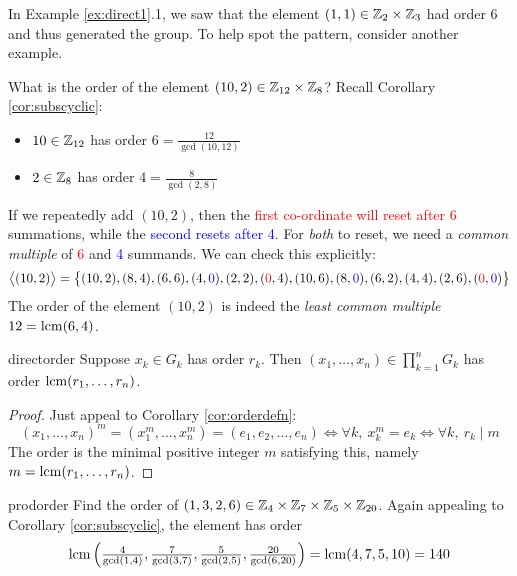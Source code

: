 In Example \ref{ex:direct1}.1, we saw that the element $(1,1)\in\mathbb{Z}_2\times\mathbb{Z}_3$ had order 6 and thus generated the group. To help spot the pattern, consider another example.

\begin{example}{}{}
What is the order of the element $(10,2)\in\mathbb{Z}_{12}\times \mathbb{Z}_8$? Recall Corollary \ref{cor:subscyclic}:
\begin{itemize}\itemsep0pt
  \item $10\in\mathbb{Z}_{12}$ has order $6=\frac{12}{\gcd(10,12)}$
  \item $2\in\mathbb{Z}_8$ has order $4=\frac 8{\gcd(2,8)}$
\end{itemize}
If we repeatedly add $(10,2)$, then the \textcolor{red}{first co-ordinate will reset after 6} summations, while the \textcolor{blue}{second resets after 4}. For \emph{both} to reset, we need a \emph{common multiple} of \textcolor{red}{6} and \textcolor{blue}{4} summands. We can check this explicitly:
\[\bigl\langle(10,2)\bigr\rangle = \bigl\{(10,2), (8,4), (6,6), (4,\textcolor{blue}{0}), (2,2), (\textcolor{red}{0},4), (10,6), (8,\textcolor{blue}{0}), (6,2), (4,4), (2,6), (\textcolor{red}{0},\textcolor{blue}{0})\bigr\}\]
The order of the element $(10,2)$ is indeed the \emph{least common multiple} $12=\operatorname{lcm}(6,4)$.
\end{example}


\begin{thm}{}{directorder}
Suppose $x_k\in G_k$ has order $r_k$. Then $(x_1,\ldots,x_n)\in \prod\limits_{k=1}^n G_k$ has order $\operatorname{lcm}(r_1,\ldots,r_n)$.
\end{thm}

\begin{proof}
Just appeal to Corollary \ref{cor:orderdefn}:
\[
(x_1,\ldots,x_n)^m=(x_1^m,\ldots,x_n^m)=(e_1,e_2,\ldots,e_n)\iff \forall k,\ x_k^m=e_k \iff \forall k,\ r_k\mid m
\]
The order is the minimal positive integer $m$ satisfying this, namely $m=\operatorname{lcm}(r_1,\ldots,r_n)$.
\end{proof}



\begin{example}{}{prodorder}
Find the order of $(1,3,2,6)\in\mathbb{Z}_4\times\mathbb{Z}_7\times\mathbb{Z}_5\times\mathbb{Z}_{20}$.\smallbreak
Again appealing to Corollary \ref{cor:subscyclic}, the element has order
\[
\operatorname{lcm}\left(\tfrac 4{\gcd(1,4)}, \tfrac 7{\gcd(3,7)}, \tfrac 5{\gcd(2,5)}, \tfrac{20}{\gcd(6,20)}\right) =\operatorname{lcm}(4,7,5,10)=140
\]
\end{example}




